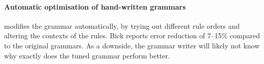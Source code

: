 






\paragraph{Automatic optimisation of hand-written grammars }

 modifies the grammar automatically, by trying
out different rule orders and altering the contexts of the rules.
Bick reports error reduction of 7--15\% compared to the original grammars.
As a downside, the grammar writer will likely not know why exactly does the tuned grammar perform better.



